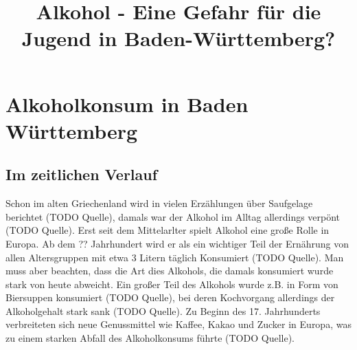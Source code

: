 \documentclass[12pt]{article}
\title{Alkohol - Eine Gefahr für die Jugend in Baden-Württemberg?}
\begin{document}
\maketitle
\tableofcontents


\section{Alkoholkonsum in Baden Württemberg}



\subsection{Im zeitlichen Verlauf}
Schon im alten Griechenland wird in vielen Erzählungen über Saufgelage berichtet (TODO Quelle), damals war der Alkohol im Alltag allerdings verpönt (TODO Quelle). Erst seit dem Mittelarlter spielt Alkohol eine große Rolle in Europa. Ab dem ?? Jahrhundert wird er als ein wichtiger Teil der Ernährung von allen Altersgruppen mit etwa 3 Litern täglich Konsumiert (TODO Quelle). Man muss aber beachten, dass die Art dies Alkohols, die damals konsumiert wurde stark von heute abweicht. Ein großer Teil des Alkohols wurde z.B. in Form von Biersuppen konsumiert (TODO Quelle), bei deren Kochvorgang allerdings der Alkoholgehalt stark sank (TODO Quelle). Zu Beginn des 17. Jahrhunderts verbreiteten sich neue Genussmittel wie Kaffee, Kakao und Zucker in Europa, was zu einem starken Abfall des Alkoholkonsums führte (TODO Quelle). 
\end{document}

